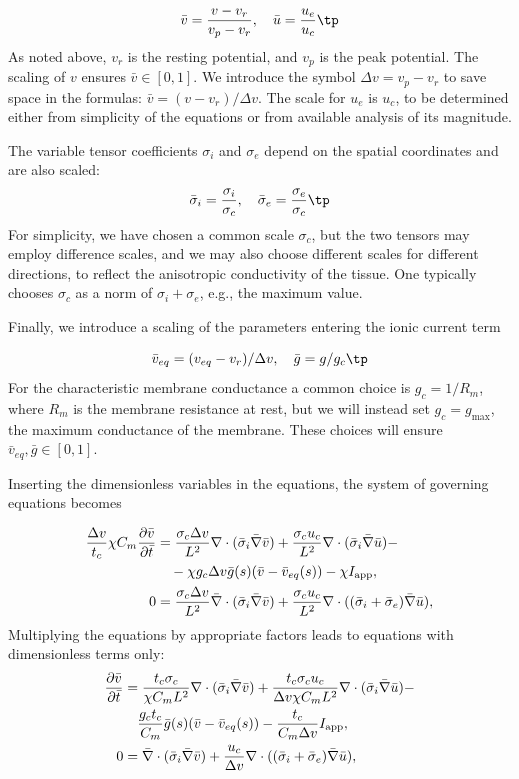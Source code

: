 \documentclass[graybox,envcountchap,sectrefs,final]{svmonodo}
\begin{document}
\[ \bar v = \frac{v-v_r}{v_p-v_r},\quad \bar u = \frac{u_e}{u_c} \tp\]
As noted above, $v_r$ is the resting potential, and $v_p$ is the peak potential.
The scaling of $v$ ensures $\bar v\in [0,1]$. We introduce the symbol
$\Delta v = v_p-v_r$ to save space in the formulas: $\bar v = (v-v_r)/\Delta v$.
The scale for $u_e$ is $u_c$, to be
determined either from simplicity of the equations or from available analysis of
its magnitude.

The variable tensor coefficients $\sigma_i$ and $\sigma_e$ depend on the spatial
coordinates and are also scaled:
\[ \bar \sigma_i = \frac{\sigma_i}{\sigma_c},\quad \bar \sigma_e = \frac{\sigma_e}{\sigma_c}\tp\]
For simplicity, we have chosen a common scale $\sigma_c$, but the two tensors
may employ difference scales, and we may also choose different scales
for different directions, to reflect the anisotropic conductivity of
the tissue. One typically chooses $\sigma_c$ as a norm of
$\sigma_i + \sigma_e$, e.g., the maximum value.

Finally, we introduce a scaling of the parameters entering the ionic
current term

\[ \bar v_{eq} = (v_{eq}-v_r)/\Delta v,\quad\bar g = g/g_c\tp\]
For the characteristic membrane conductance a common choice is
$g_c = 1/R_m$, where $R_m$ is the membrane resistance at
rest, but we will instead set $g_c = g_{\max}$, the maximum conductance
of the membrane. These choices will ensure $\bar v_{eq}, \bar g \in
[0,1]$.


Inserting the dimensionless variables in the equations, the system
of governing equations becomes

\begin{align*}
\frac{\Delta v}{t_c}\chi C_m\frac{\partial \bar v}{\partial \bar t} &=
\frac{\sigma_c\Delta v }{L^2}\nabla\cdot( \bar \sigma_i\bar\nabla\bar v) +
\frac{\sigma_c u_c}{L^2}\nabla\cdot (\bar \sigma_i\bar \nabla \bar u) -\\ 
&\quad - \chi g_c \Delta v \bar g (s)(\bar v-\bar v_{eq}(s)) -\chi I_{\rm{app}},
\\ 
0 &= \frac{\sigma_c\Delta v }{L^2}\bar \nabla\cdot( \bar \sigma_i\bar \nabla \bar v) + \frac{\sigma_cu_c}{L^2}\nabla\cdot ((\bar \sigma_i + \bar \sigma_e)\bar \nabla \bar u),\\ 
\end{align*}
Multiplying the equations by appropriate factors leads to equations with
dimensionless terms only:
\begin{align*}
\frac{\partial \bar v}{\partial \bar t} &=
\frac{t_c\sigma_c}{\chi C_mL^2}\nabla\cdot( \bar \sigma_i\bar\nabla\bar v) +
\frac{t_c\sigma_c u_c}{\Delta v \chi C_mL^2}\nabla\cdot (\bar
\sigma_i\bar \nabla \bar u) - \\ 
&\quad
\frac{g_c t_c}{C_m} \bar g (s)(\bar v-\bar v_{eq}(s))
- \frac{t_c}{C_m\Delta v} I_{\rm{app}},\\ 
0 &= \bar \nabla\cdot( \bar \sigma_i\bar \nabla \bar v) + \frac{u_c}{\Delta v}\nabla\cdot ((\bar \sigma_i + \bar \sigma_e)\bar \nabla \bar u),\\ 
\end{align*}
\end{document}
